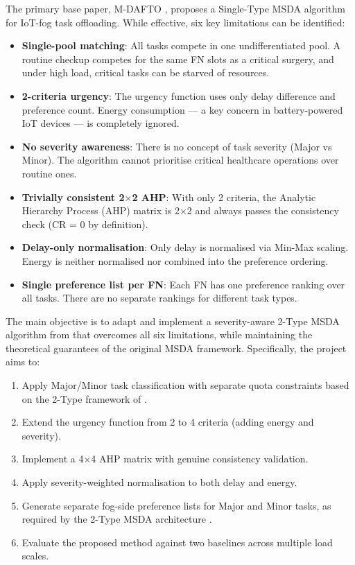 The primary base paper, M-DAFTO \cite{swain2024mdafto}, proposes a Single-Type MSDA algorithm for IoT-fog task offloading. While effective, six key limitations can be identified:

\begin{itemize}
\item \textbf{Single-pool matching}: All tasks compete in one undifferentiated pool. A routine checkup competes for the same FN slots as a critical surgery, and under high load, critical tasks can be starved of resources.
\item \textbf{2-criteria urgency}: The urgency function uses only delay difference and preference count. Energy consumption --- a key concern in battery-powered IoT devices --- is completely ignored.
\item \textbf{No severity awareness}: There is no concept of task severity (Major vs Minor). The algorithm cannot prioritise critical healthcare operations over routine ones.
\item \textbf{Trivially consistent 2$\times$2 AHP}: With only 2 criteria, the Analytic Hierarchy Process (AHP) matrix is 2$\times$2 and always passes the consistency check (CR = 0 by definition).
\item \textbf{Delay-only normalisation}: Only delay is normalised via Min-Max scaling. Energy is neither normalised nor combined into the preference ordering.
\item \textbf{Single preference list per FN}: Each FN has one preference ranking over all tasks. There are no separate rankings for different task types.
\end{itemize}

The main objective is to adapt and implement a severity-aware 2-Type MSDA algorithm from \cite{oomori2026strategyproof} that overcomes all six limitations, while maintaining the theoretical guarantees of the original MSDA framework. Specifically, the project aims to:

\begin{enumerate}
\item Apply Major/Minor task classification with separate quota constraints based on the 2-Type framework of \cite{oomori2026strategyproof}.
\item Extend the urgency function from 2 to 4 criteria (adding energy and severity).
\item Implement a 4$\times$4 AHP matrix with genuine consistency validation.
\item Apply severity-weighted normalisation to both delay and energy.
\item Generate separate fog-side preference lists for Major and Minor tasks, as required by the 2-Type MSDA architecture \cite{oomori2026strategyproof}.
\item Evaluate the proposed method against two baselines across multiple load scales.
\end{enumerate}